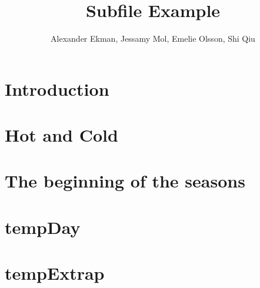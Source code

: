 \documentclass[a4paper]{article}
\title{Subfile Example}
\author{Alexander Ekman, Jessamy Mol, Emelie Olsson, Shi Qiu}
\date{ }
\begin{document}
 
 
 

\maketitle

\section{Introduction}
 


\section{Hot and Cold}


\section{The beginning of the seasons}


\section{tempDay}


\section{tempExtrap}


\newpage


 
\end{document}
